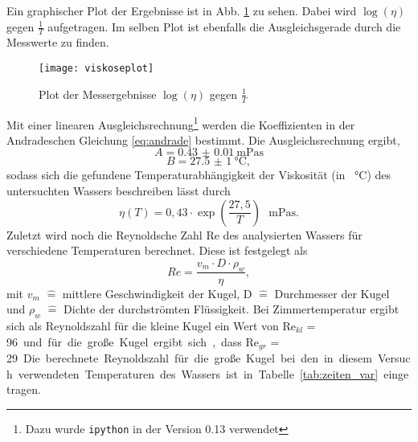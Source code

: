 Ein graphischer Plot der Ergebnisse ist in Abb. \ref{fig:viskoseplot} zu
sehen. Dabei wird $\log{(\eta)}$ gegen $\frac{1}{T}$ aufgetragen. Im
selben Plot ist ebenfalls die Ausgleichsgerade durch die Messwerte zu
finden.
%
\begin{figure}[h]
\centering
\texttt{[image: viskoseplot]}
\caption{Plot der Messergebnisse $\log{(\eta)}$ gegen $\frac{1}{T}$}
\label{fig:viskoseplot}
\end{figure}
%
Mit einer linearen Ausgleichsrechnung\footnote{Dazu wurde \texttt{ipython} in der Version 0.13  verwendet} werden die Koeffizienten in der Andradeschen Gleichung \eqref{eq:andrade} bestimmt. Die Ausgleichsrechnung ergibt,
\begin{equation*}
A = \SI{0.43(1)}{\milli\pascal\second}
\end{equation*}
\begin{equation*}
B = \SI{27.5(10)}{\celsius},
\end{equation*}
sodass sich die gefundene Temperaturabhängigkeit der Viskosität (in \SI{}{\celsius}) des untersuchten Wassers beschreiben lässt durch
\begin{equation*}
\eta(T) = 0,43 \cdot \exp{\left(\frac{27,5}{T}\right)} \text{ }\si{\milli\pascal\second}.
\end{equation*}
%
Zuletzt wird noch die Reynoldsche Zahl Re des analysierten Wassers für verschiedene Temperaturen berechnet. Diese ist festgelegt als
\begin{equation*}
Re = \frac{v_m \cdot D \cdot \rho_{w}}{\eta},
\end{equation*}
mit $v_m$ $\hat{=}$ mittlere Geschwindigkeit der Kugel, D $\hat{=}$
Durchmesser der Kugel und $\rho_{w}$ $\hat{=}$ Dichte der durchströmten
Flüssigkeit. Bei Zimmertemperatur ergibt sich als Reynoldszahl für die
kleine Kugel ein Wert von $\text{Re}_{kl}$ = \SI{96} und für die große
Kugel ergibt sich, dass $\text{Re}_{gr}$ = \SI{29}.
Die berechnete Reynoldszahl für die große Kugel bei den in diesem Versuch verwendeten Temperaturen des Wassers ist in Tabelle \ref{tab:zeiten_var} eingetragen.
%